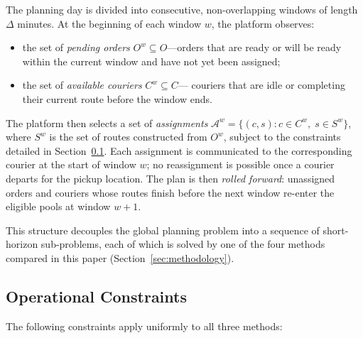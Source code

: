 The planning day is divided into consecutive, non-overlapping
windows of length $\Delta$ minutes.
At the beginning of each window $w$, the platform observes:

\begin{itemize}
    \item the set of \emph{pending orders} $O^w \subseteq O$—orders
    that are ready or will be ready within the current window and
    have not yet been assigned;
    \item the set of \emph{available couriers} $C^w \subseteq C$—
    couriers that are idle or completing their current route before
    the window ends.
\end{itemize}

\noindent
The platform then selects a set of \emph{assignments}
$\mathcal{A}^w = \{(c, s) : c \in C^w,\; s \in S^w\}$,
where $S^w$ is the set of routes constructed from $O^w$,
subject to the constraints detailed in
Section~\ref{subsec:constraints}.
Each assignment is communicated to the corresponding courier
at the start of window $w$; no reassignment is possible once
a courier departs for the pickup location.
The plan is then \emph{rolled forward}: unassigned orders
and couriers whose routes finish before the next window
re-enter the eligible pools at window $w+1$.

This structure decouples the global planning problem into a
sequence of short-horizon sub-problems, each of which is
solved by one of the four methods compared in this paper
(Section~\ref{sec:methodology}).

\subsection{Operational Constraints}\label{subsec:constraints}

The following constraints apply uniformly to all three methods:

